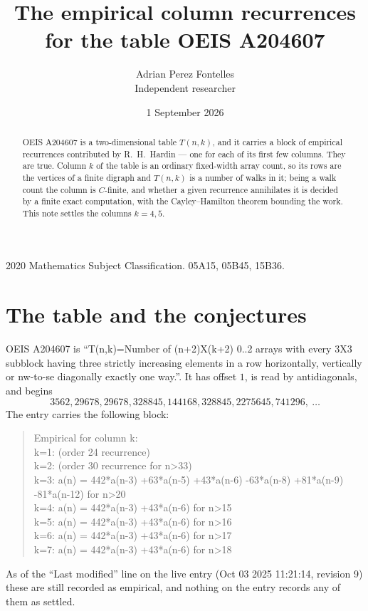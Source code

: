 \documentclass[11pt,a4paper]{article}
\title{The empirical column recurrences for the table OEIS A204607}
\author{Adrian Perez Fontelles\\ \small Independent researcher}
\date{1 September 2026}
\theoremstyle{plain}
\theoremstyle{definition}
\begin{document}
\maketitle

\begin{abstract}
OEIS A204607 is a two-dimensional table $T(n,k)$, and it carries a block of empirical
recurrences contributed by R.~H.~Hardin --- one for each of its first few columns. They are
true. Column $k$ of the table is an ordinary fixed-width array count, so its rows are the
vertices of a finite digraph and $T(n,k)$ is a number of walks in it; being a walk count the
column is $C$-finite, and whether a given recurrence annihilates it is decided by a finite
exact computation, with the Cayley--Hamilton theorem bounding the work. This note settles the columns $k=4, 5$.
\end{abstract}

\noindent\small 2020 Mathematics Subject Classification. 05A15, 05B45, 15B36.\normalsize

\section{The table and the conjectures}

OEIS A204607 is ``T(n,k)=Number of (n+2)X(k+2) 0..2 arrays with every 3X3 subblock having three strictly increasing elements in a row horizontally, vertically or nw-to-se diagonally exactly one way.''. It has offset $1$, is
read by antidiagonals, and begins
\[
3562, 29678, 29678, 328845, 144168, 328845, 2275645, 741296,\ \dots
\]
The entry carries the following block:
\begin{quote}\small
Empirical for column k:\\
k=1: (order 24 recurrence)\\
k=2: (order 30 recurrence for n>33)\\
k=3: a(n) = 442*a(n-3) +63*a(n-5) +43*a(n-6) -63*a(n-8) +81*a(n-9) -81*a(n-12) for n>20\\
k=4: a(n) = 442*a(n-3) +43*a(n-6) for n>15\\
k=5: a(n) = 442*a(n-3) +43*a(n-6) for n>16\\
k=6: a(n) = 442*a(n-3) +43*a(n-6) for n>17\\
k=7: a(n) = 442*a(n-3) +43*a(n-6) for n>18\\
\end{quote}
As of the ``Last modified'' line on the live entry (Oct 03 2025 11:21:14, revision 9) these are still
recorded as empirical, and nothing on the entry records any of them as settled.
\end{document}
